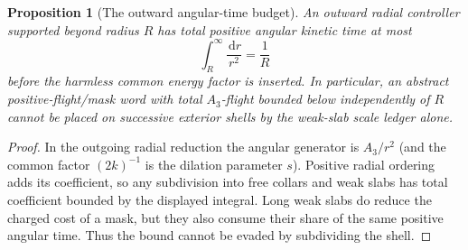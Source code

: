 \documentclass[11pt]{article}
\newtheorem{proposition}[theorem]{Proposition}
\theoremstyle{remark}
\newcommand{\dd}{\,\mathrm d}
\begin{document}
\begin{proposition}[The outward angular-time budget]
\label{prop:outward-angular-time-budget}
An outward radial controller supported beyond radius $R$ has total positive
angular kinetic time at most
\begin{equation}
 \int_R^\infty\frac{\dd r}{r^2}=\frac1R
 \label{eq:outward-angular-time-budget}
\end{equation}
before the harmless common energy factor is inserted.  In particular, an
abstract positive-flight/mask word with total $A_3$-flight bounded below
independently of $R$ cannot be placed on successive exterior shells by the
weak-slab scale ledger alone.
\end{proposition}

\begin{proof}
In the outgoing radial reduction the angular generator is
$A_3/r^2$ (and the common factor $(2k)^{-1}$ is the dilation parameter
$s$).  Positive radial ordering adds its coefficient, so any subdivision
into free collars and weak slabs has total coefficient bounded by the
displayed integral.  Long weak slabs do reduce the charged cost of a mask,
but they also consume their share of the same positive angular time.  Thus
the bound cannot be evaded by subdividing the shell.
\end{proof}
\end{document}
